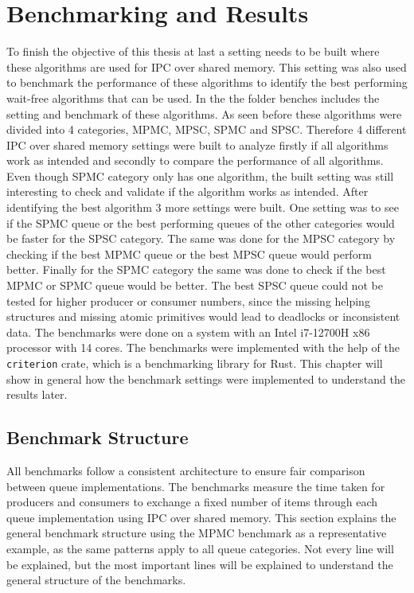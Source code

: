 \chapter{Benchmarking and Results}\label{ch:results}
To finish the objective of this thesis at last a setting needs to be built where these algorithms are used for \ac{IPC} over shared memory. This setting was also used to benchmark the performance of these algorithms to identify the best performing wait-free algorithms that can be used. In the \cite{githubMA} the folder benches includes the setting and benchmark of these algorithms. As seen before these algorithms were divided into 4 categories, \ac{MPMC}, \ac{MPSC}, \ac{SPMC} and \ac{SPSC}. Therefore 4 different \ac{IPC} over shared memory settings were built to analyze firstly if all algorithms work as intended and secondly to compare the performance of all algorithms. Even though \ac{SPMC} category only has one algorithm, the built setting was still interesting to check and validate if the algorithm works as intended. After identifying the best algorithm 3 more settings were built. One setting was to see if the \ac{SPMC} queue or the best performing queues of the other categories would be faster for the \ac{SPSC} category. The same was done for the \ac{MPSC} category by checking if the best \ac{MPMC} queue or the best \ac{MPSC} queue would perform better. Finally for the \ac{SPMC} category the same was done to check if the best \ac{MPMC} or \ac{SPMC} queue would be better. The best \ac{SPSC} queue could not be tested for higher producer or consumer numbers, since the missing helping structures and missing atomic primitives would lead to deadlocks or inconsistent data. The benchmarks were done on a system with an Intel i7-12700H x86 processor with 14 cores. The benchmarks were implemented with the help of the \texttt{criterion} crate, which is a benchmarking library for Rust. This chapter will show in general how the benchmark settings were implemented to understand the results later.

\section{Benchmark Structure}
All benchmarks follow a consistent architecture to ensure fair comparison between queue implementations. The benchmarks measure the time taken for producers and consumers to exchange a fixed number of items through each queue implementation using \ac{IPC} over shared memory. This section explains the general benchmark structure using the \ac{MPMC} benchmark as a representative example, as the same patterns apply to all queue categories. Not every line will be explained, but the most important lines will be explained to understand the general structure of the benchmarks. 

